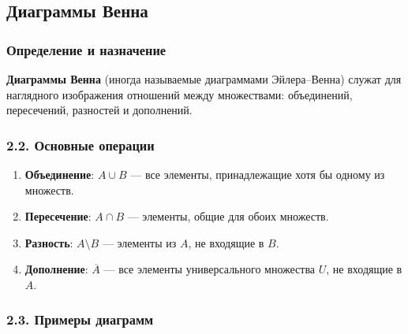 \subsection{Диаграммы Венна}

\subsubsection{Определение и назначение}

\textbf{Диаграммы Венна} (иногда называемые диаграммами Эйлера–Венна) служат для наглядного изображения отношений между множествами: объединений, пересечений, разностей и дополнений.

\subsubsection{2.2. Основные операции}

\begin{enumerate}[label=\arabic*)]
  \item \textbf{Объединение}: \(A \cup B\) — все элементы, принадлежащие хотя бы одному из множеств.
  \item \textbf{Пересечение}: \(A \cap B\) — элементы, общие для обоих множеств.
  \item \textbf{Разность}: \(A \setminus B\) — элементы из \(A\), не входящие в \(B\).
  \item \textbf{Дополнение}: \(\overline{A}\) — все элементы универсального множества \(U\), не входящие в \(A\).
\end{enumerate}

\subsubsection{2.3. Примеры диаграмм}

